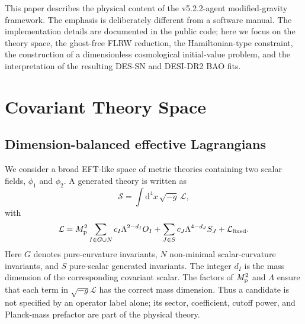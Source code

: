 \documentclass[aps,prd,twocolumn,superscriptaddress,nofootinbib,longbibliography]{revtex4-2}
\newcommand{\dd}{\mathrm{d}}
\newcommand{\Lag}{\mathcal{L}}
\newcommand{\calS}{\mathcal{S}}
\newcommand{\Mp}{M_{\rm p}}
\newcommand{\Lam}{\Lambda}
\begin{document}
This paper describes the physical content of the v5.2.2-agent modified-gravity framework.  The emphasis is deliberately different from a software manual.  The implementation details are documented in the public code; here we focus on the theory space, the ghost-free FLRW reduction, the Hamiltonian-type constraint, the construction of a dimensionless cosmological initial-value problem, and the interpretation of the resulting DES-SN and DESI-DR2 BAO fits.

\section{Covariant Theory Space}
\label{sec:theory-space}

\subsection{Dimension-balanced effective Lagrangians}
\label{subsec:dimension-balanced}

We consider a broad EFT-like space of metric theories containing two scalar fields, $\phi_1$ and $\phi_2$.  A generated theory is written as
\begin{equation}
\calS=\int \dd^4x\,\sqrt{-g}\,\Lag ,
\label{eq:action}
\end{equation}
with
\begin{equation}
\Lag=
\Mp^2\sum_{I\in G\cup N}
c_I\Lam^{2-d_I}O_I
+
\sum_{J\in S}c_J\Lam^{4-d_J}S_J
+
\Lag_{\rm fixed}.
\label{eq:lagrangian}
\end{equation}
Here $G$ denotes pure-curvature invariants, $N$ non-minimal scalar-curvature invariants, and $S$ pure-scalar generated invariants.  The integer $d_I$ is the mass dimension of the corresponding covariant scalar.  The factors of $\Mp^2$ and $\Lam$ ensure that each term in $\sqrt{-g}\Lag$ has the correct mass dimension.  Thus a candidate is not specified by an operator label alone; its sector, coefficient, cutoff power, and Planck-mass prefactor are part of the physical theory.
\end{document}
